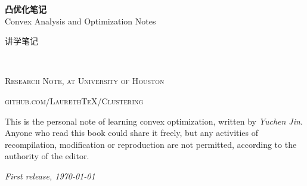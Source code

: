 \documentclass[mainfont=Libertine,Chinese]{CMNBook} %
\renewcommand{\FrameFolder}{FramePics/mathbook/}
\begin{document}

\begingroup
\thispagestyle{empty}
\centering
\vspace*{5cm}
\begin{tcolorbox}[standard jigsaw, colframe=cyan, arc=16pt,
	opacityframe=1, opacityback=0.7]
	\centering
	\vspace*{0.5cm}
	\par\normalfont\fontsize{35}{35}\sffamily\selectfont
	\textbf{凸优化笔记}\\
	{\LARGE Convex Analysis and Optimization Notes}\par %
	\vspace*{1cm}
	{\Huge 讲学笔记}\par %
	\vspace*{0.5cm}
\end{tcolorbox}
\endgroup


\newpage
~\vfill
\thispagestyle{empty}


\noindent \textsc{Research Note, at University of Houston}

\noindent \textsc{github.com/LaurethTeX/Clustering} %

\noindent This is the personal note of learning convex optimization, written by \textit{Yuchen Jin}. Anyone who read this book could share it freely, but any activities of recompilation, modification or reproduction are not permitted, according to the authority of the editor. %

\noindent \textit{First release, \today} %


\end{document}
